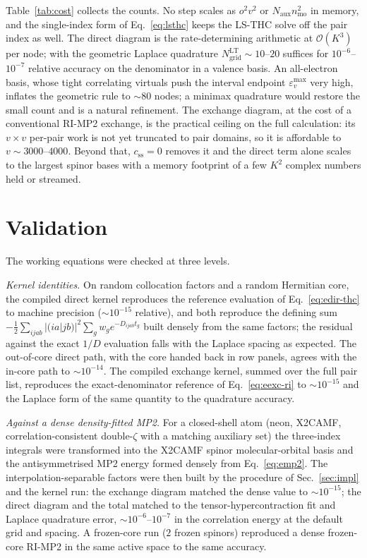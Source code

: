 \documentclass[aip,jcp,amsmath,amssymb,preprint,superscriptaddress]{revtex4-2}%
\newcommand{\Naux}{N_{\mathrm{aux}}}
\newcommand{\Ngrid}{N_{\mathrm{grid}}}
\newcommand{\Ord}[1]{\mathcal{O}\!\left(#1\right)}
\begin{document}
Table~\ref{tab:cost} collects the counts. No step scales as $o^2v^2$ or
$\Naux n_{\mathrm{mo}}^2$ in memory, and the single-index form of
Eq.~\eqref{eq:lsthc} keeps the LS-THC solve off the pair index as well.
The direct diagram is the rate-determining arithmetic at $\Ord{K^3}$ per
node; with the geometric Laplace quadrature $\Ngrid^{\mathrm{LT}}\sim
10$--$20$ suffices for $10^{-6}$--$10^{-7}$ relative accuracy on the
denominator in a valence basis. An all-electron basis, whose tight
correlating virtuals push the interval endpoint $\varepsilon_v^{\max}$
very high, inflates the geometric rule to $\sim 80$ nodes; a minimax
quadrature would restore the small count and is a natural refinement. The
exchange
diagram, at the cost of a conventional RI-MP2 exchange, is the practical
ceiling on the full calculation: its $v\times v$ per-pair work is not yet
truncated to pair domains, so it is affordable to $v\sim 3000$--$4000$.
Beyond that, $c_{\mathrm{ss}}=0$ removes it and the direct term alone scales
to the largest spinor bases with a memory footprint of a few $K^2$ complex
numbers held or streamed.

\section{Validation}
\label{sec:val}

The working equations were checked at three levels.

\emph{Kernel identities.} On random collocation factors and a random
Hermitian core, the compiled direct kernel reproduces the reference
evaluation of Eq.~\eqref{eq:edir-thc} to machine precision
($\sim 10^{-15}$ relative), and both reproduce the defining sum
$-\tfrac12\sum_{ijab}|(ia|jb)|^2\sum_g w_g e^{-D_{ijab}t_g}$ built densely
from the same factors; the residual against the exact $1/D$ evaluation
falls with the Laplace spacing as expected. The out-of-core direct path,
with the core handed back in row panels, agrees with the in-core path to
$\sim 10^{-14}$. The compiled exchange kernel, summed over the full pair
list, reproduces the exact-denominator reference of Eq.~\eqref{eq:eexc-ri}
to $\sim 10^{-15}$ and the Laplace form of the same quantity to the
quadrature accuracy.

\emph{Against a dense density-fitted MP2.} For a closed-shell atom
(neon, X2CAMF, correlation-consistent double-$\zeta$ with a matching
auxiliary set) the three-index integrals were transformed into the X2CAMF
spinor molecular-orbital basis and the antisymmetrised MP2 energy formed
densely from Eq.~\eqref{eq:emp2}. The interpolation-separable factors were
then built by the procedure of Sec.~\ref{sec:impl} and the kernel run: the
exchange diagram matched the dense value to $\sim 10^{-15}$; the direct
diagram and the total matched to the tensor-hypercontraction fit and
Laplace quadrature error, $\sim 10^{-6}$--$10^{-7}$ in the correlation
energy at the default grid and spacing. A frozen-core run
($2$ frozen spinors) reproduced a dense frozen-core RI-MP2 in the same
active space to the same accuracy.
\end{document}
